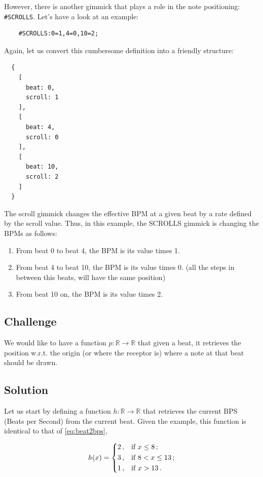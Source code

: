 \documentclass[a4paper,9pt]{article}
\begin{document}
    However, there is another gimmick that plays a role in the note positioning: \texttt{\#SCROLLS}. Let's have a look at an example:

    \begin{verbatim}
    #SCROLLS:0=1,4=0,10=2;     
    \end{verbatim}
    Again, let us convert this cumbersome definition into a friendly structure:
    \begin{verbatim}
  {
    [
      beat: 0,
      scroll: 1
    ],
    [
      beat: 4,
      scroll: 0 
    ],
    [
      beat: 10,
      scroll: 2 
    ]
  }
    \end{verbatim}
    The scroll gimmick changes the effective BPM at a given beat by a rate defined by the scroll value. Thus, in this example, the SCROLLS gimmick is changing the BPMs as follows:
    \begin{enumerate}
		\item From beat 0 to beat 4, the BPM is its value times 1.
		\item From beat 4 to beat 10, the BPM is its value times 0. (all the steps in between this beats, will have the same position)
		\item From beat 10 on, the BPM is its value times 2.
    \end{enumerate}
    \subsection{Challenge}

    We would like to have a function $ p: \mathbb{R} \rightarrow \mathbb{R} $ that given a beat, it retrieves the position w.r.t. the origin (or where the receptor is) where a note at that beat should be drawn.

    \subsection{Solution}
    Let us start by defining a function $h: \mathbb{R} \rightarrow \mathbb{R}$ that retrieves the current BPS (Beats per Second) from the current beat. Given the example, this function is identical to that of \eqref{eq:beat2bps},

    \begin{equation}
	    h(x) = \begin{dcases}
		    2\,, & \text{if $x \leq 8\,;$}\\ 
		    3\,, & \text{if $8 < x \leq 13\,;$}\\ 
		    1\,, & \text{if $x > 13\,.$}\\ 
	    \end{dcases}
	    \label{eq:beat2bps-as-h}
    \end{equation}
\end{document}

